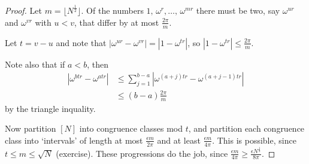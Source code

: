 \documentclass[a4paper]{article}
\newcommand*\abs[1]{\left|#1\right|}
\begin{document}
\begin{proof}
	Let $m=\lfloor N^{\frac{1}{2}}\rfloor$. Of the numbers $1,\, \omega^r,\dots,\, \omega ^{mr}$ there must be two, say $\omega^{ur}$ and $\omega^{vr}$ with $u<v$, that differ by at most $\frac{2\pi}{m}$.
	
	Let $t=v-u$ and note that $\abs{\omega^{ur}-\omega^{vr}} = \abs{1-\omega^{tr}}$, so $\abs{1-\omega^{tr}} \leq \frac{2\pi}{m}$.
	
	Note also that if $a < b$, then
	\begin{align*}
		\abs{\omega^{btr}-\omega^{atr}} & \leq \sum_{j=1}^{b-a}\abs{\omega^{(a+j)tr}-\omega^{(a+j-1)tr}}\\
		&\leq(b-a)\frac{2\pi}{m}
	\end{align*}
	by the triangle inquality.
	
	Now partition $[N]$ into congruence classes mod $t$, and partition each congruence class into `intervals' of length at most $\frac{\epsilon m}{2\pi}$ and at least $\frac{\epsilon m}{4\pi}$. This is possible, since $t \leq m \leq \sqrt{N}$ (exercise). These progressions do the job, since $\frac{\epsilon m}{4\pi} \geq \frac{\epsilon N^{\frac{1}{2}}}{8\pi}$.
\end{proof}
\end{document}
